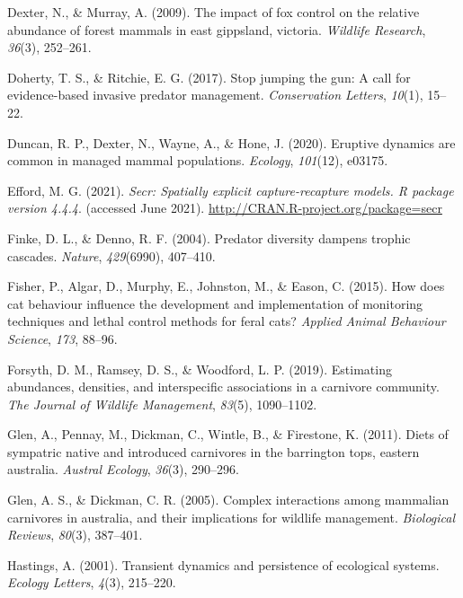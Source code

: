 \documentclass[]{elsarticle} %
\begin{document}
\leavevmode\hypertarget{ref-dexter2009impact}{}%
Dexter, N., \& Murray, A. (2009). The impact of fox control on the relative abundance of forest mammals in east gippsland, victoria. \emph{Wildlife Research}, \emph{36}(3), 252--261.

\leavevmode\hypertarget{ref-doherty2017}{}%
Doherty, T. S., \& Ritchie, E. G. (2017). Stop jumping the gun: A call for evidence-based invasive predator management. \emph{Conservation Letters}, \emph{10}(1), 15--22.

\leavevmode\hypertarget{ref-duncan2020eruptive}{}%
Duncan, R. P., Dexter, N., Wayne, A., \& Hone, J. (2020). Eruptive dynamics are common in managed mammal populations. \emph{Ecology}, \emph{101}(12), e03175.

\leavevmode\hypertarget{ref-efford2021secr}{}%
Efford, M. G. (2021). \emph{Secr: Spatially explicit capture-recapture models. R package version 4.4.4}. (accessed June 2021). \url{http://CRAN.R-project.org/package=secr}

\leavevmode\hypertarget{ref-finke2004}{}%
Finke, D. L., \& Denno, R. F. (2004). Predator diversity dampens trophic cascades. \emph{Nature}, \emph{429}(6990), 407--410.

\leavevmode\hypertarget{ref-fisher2015}{}%
Fisher, P., Algar, D., Murphy, E., Johnston, M., \& Eason, C. (2015). How does cat behaviour influence the development and implementation of monitoring techniques and lethal control methods for feral cats? \emph{Applied Animal Behaviour Science}, \emph{173}, 88--96.

\leavevmode\hypertarget{ref-forsyth2019}{}%
Forsyth, D. M., Ramsey, D. S., \& Woodford, L. P. (2019). Estimating abundances, densities, and interspecific associations in a carnivore community. \emph{The Journal of Wildlife Management}, \emph{83}(5), 1090--1102.

\leavevmode\hypertarget{ref-glen2011}{}%
Glen, A., Pennay, M., Dickman, C., Wintle, B., \& Firestone, K. (2011). Diets of sympatric native and introduced carnivores in the barrington tops, eastern australia. \emph{Austral Ecology}, \emph{36}(3), 290--296.

\leavevmode\hypertarget{ref-glen2005}{}%
Glen, A. S., \& Dickman, C. R. (2005). Complex interactions among mammalian carnivores in australia, and their implications for wildlife management. \emph{Biological Reviews}, \emph{80}(3), 387--401.

\leavevmode\hypertarget{ref-hastings2001}{}%
Hastings, A. (2001). Transient dynamics and persistence of ecological systems. \emph{Ecology Letters}, \emph{4}(3), 215--220.
\end{document}
